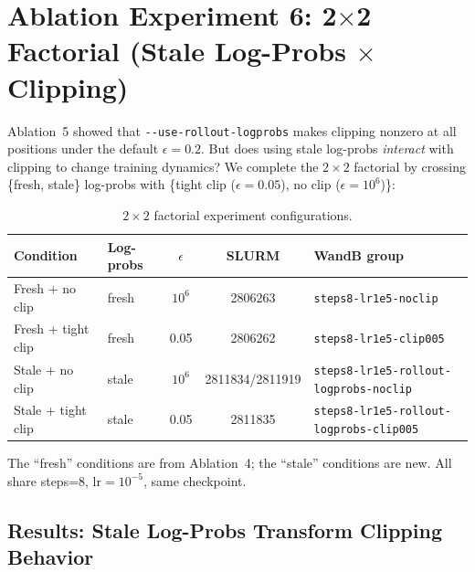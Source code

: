 \documentclass[11pt,a4paper]{article}
\begin{document}
\section{Ablation Experiment 6: 2$\times$2 Factorial (Stale Log-Probs $\times$ Clipping)}
\label{sec:factorial_results}

Ablation~5 showed that \texttt{-{}-use-rollout-logprobs} makes clipping nonzero
at all positions under the default $\epsilon = 0.2$. But does using stale
log-probs \emph{interact} with clipping to change training dynamics?
We complete the $2 \times 2$ factorial by crossing \{fresh, stale\} log-probs
with \{tight clip ($\epsilon = 0.05$), no clip ($\epsilon = 10^6$)\}:

\begin{table}[H]
\centering
\caption{$2 \times 2$ factorial experiment configurations.}
\label{tab:factorial_configs}
\begin{tabular}{@{}llccl@{}}
\toprule
\textbf{Condition} & \textbf{Log-probs} & $\epsilon$ & \textbf{SLURM} & \textbf{WandB group} \\
\midrule
Fresh + no clip    & fresh  & $10^6$ & 2806263 & \texttt{steps8-lr1e5-noclip} \\
Fresh + tight clip & fresh  & 0.05   & 2806262 & \texttt{steps8-lr1e5-clip005} \\
Stale + no clip    & stale  & $10^6$ & 2811834/2811919 & \texttt{steps8-lr1e5-rollout-logprobs-noclip} \\
Stale + tight clip & stale  & 0.05   & 2811835 & \texttt{steps8-lr1e5-rollout-logprobs-clip005} \\
\bottomrule
\end{tabular}
\end{table}

The ``fresh'' conditions are from Ablation~4; the ``stale'' conditions are new.
All share steps=8, $\mathrm{lr} = 10^{-5}$, same checkpoint.

\subsection{Results: Stale Log-Probs Transform Clipping Behavior}
\end{document}
